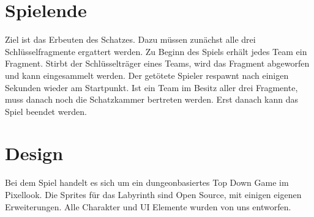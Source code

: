 \documentclass[10pt,a4paper,notitlepage]{scrreprt}
\begin{document}
		\section{Spielende}
		Ziel ist das Erbeuten des Schatzes. Dazu müssen zunächst alle drei Schlüsselfragmente ergattert werden. Zu Beginn des Spiels erhält jedes Team ein Fragment. Stirbt der Schlüsselträger eines Teams, wird das Fragment abgeworfen und kann eingesammelt werden. Der getötete Spieler respawnt nach einigen Sekunden wieder am Startpunkt. Ist ein Team im Besitz aller drei Fragmente, muss danach noch die Schatzkammer bertreten werden. Erst danach kann das Spiel beendet werden.\\

		\section{Design}
		Bei dem Spiel handelt es sich um ein dungeonbasiertes Top Down Game im Pixellook. Die Sprites für das Labyrinth sind Open Source, mit einigen eigenen Erweiterungen. Alle Charakter und UI Elemente wurden von uns entworfen.\\
\end{document}
